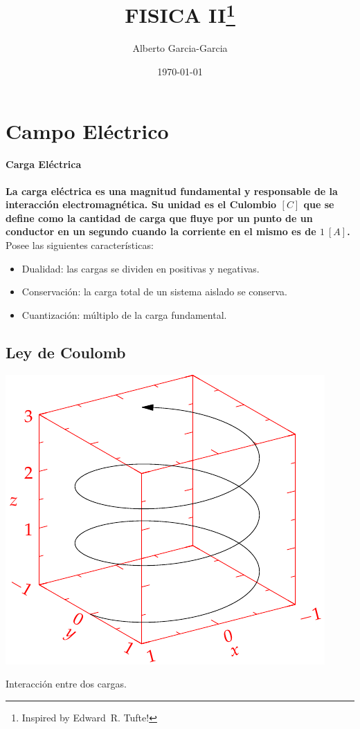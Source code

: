 \documentclass{tufte-handout}
\title{FISICA II\thanks{Inspired by Edward~R. Tufte!}}
\author[Alberto Garcia-Garcia]{Alberto Garcia-Garcia}
\date{\today}  %
\begin{document}
\maketitle%

\begin{abstract}
%
\end{abstract}

\section{Campo Eléctrico}

\paragraph{Carga Eléctrica} \textbf{La carga eléctrica es una magnitud fundamental y responsable de la interacción electromagnética. Su unidad es el Culombio $[C]$ que se define como la cantidad de carga que fluye por un punto de un conductor en un segundo cuando la corriente en el mismo es de $1~[A]$.} Posee las siguientes características:

\begin{itemize}
    \item Dualidad: las cargas se dividen en positivas y negativas.
    \item Conservación: la carga total de un sistema aislado se conserva.
    \item Cuantización: múltiplo de la carga fundamental.
\end{itemize}

\subsection{Ley de Coulomb}

\begin{marginfigure}%
    \includegraphics[width=\linewidth]{helix}
    \caption{Interacción entre dos cargas.}
    \label{fig:leycoulomb}
\end{marginfigure}
\end{document}
